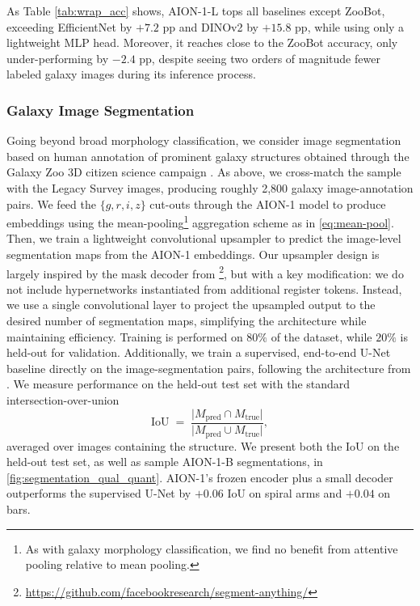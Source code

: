 \documentclass[]{polymathic}
\begin{document}
As Table \ref{tab:wrap_acc} shows, AION-1-L tops all baselines except ZooBot, exceeding EfficientNet by $+7.2$ pp and DINOv2 by $+15.8$ pp, while using only a lightweight MLP head. Moreover, it reaches close to the ZooBot accuracy, only under-performing by $-2.4$ pp, despite seeing two orders of magnitude fewer labeled galaxy images during its inference process.  

\subsubsection{Galaxy Image Segmentation}
\label{sec:galaxy-image-segmentation}

Going beyond broad morphology classification, we consider image segmentation based on human annotation of prominent galaxy structures obtained through the Galaxy Zoo 3D citizen science campaign \citep{10.1093/mnras/stab2282}. As above, we cross-match the sample with the Legacy Survey images, producing roughly 2,800 galaxy image-annotation pairs. We feed the $\{g,r,i,z\}$ cut-outs through the AION-1 model to produce embeddings using the mean-pooling\footnote{As with galaxy morphology classification, we find no benefit from attentive pooling relative to mean pooling.} aggregation scheme as in \autoref{eq:mean-pool}. Then, we train a lightweight convolutional upsampler to predict the image-level segmentation maps from the AION-1 embeddings. Our upsampler design is largely inspired by the mask decoder from \citet{sam}\footnote{\url{https://github.com/facebookresearch/segment-anything/}}, but with a key modification: we do not include hypernetworks instantiated from additional register tokens. Instead, we use a single convolutional layer to project the upsampled output to the desired number of segmentation maps, simplifying the architecture while maintaining efficiency. Training is performed on $80\%$ of the dataset, while $20\%$ is held-out for validation. Additionally, we train a supervised, end-to-end U-Net baseline directly on the image-segmentation pairs, following the architecture from \citep{walmsley2023deeplearningsegmentationspiral}. We measure performance on the held-out test set with the standard intersection-over-union  
\begin{equation}
    \mathrm{IoU}
  \;=\;
  \frac{\lvert M_{\text{pred}}\cap M_{\text{true}}\rvert}
       {\lvert M_{\text{pred}}\cup M_{\text{true}}\rvert},
\end{equation}
\label{eq:iou}
averaged over images containing the structure. We present both the IoU on the held-out test set, as well as sample AION-1-B segmentations, in \autoref{fig:segmentation_qual_quant}. AION-1’s frozen encoder plus a small decoder outperforms the supervised U-Net by $+0.06$ IoU on spiral arms and $+0.04$ on bars.
\end{document}
